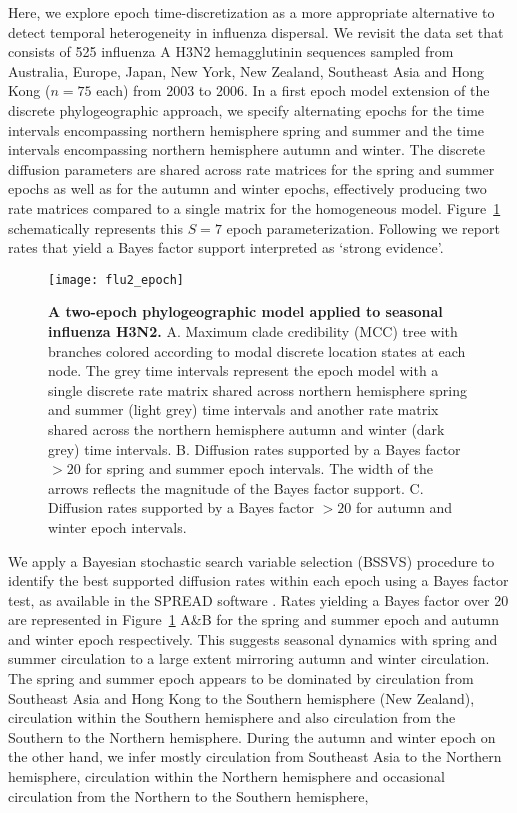 Here, we explore epoch time-discretization as a more appropriate alternative to detect temporal heterogeneity in influenza dispersal.
We revisit the \citet{Bahl2011} data set that consists of 525 influenza A H3N2 hemagglutinin sequences sampled from  Australia, Europe, Japan, New York, New Zealand, Southeast Asia and Hong Kong ($n=75$ each) from 2003 to 2006.
In a first epoch model extension of the discrete phylogeographic approach, we specify alternating epochs for the time intervals encompassing northern hemisphere spring and summer and the time intervals encompassing northern hemisphere autumn and winter.
The discrete diffusion parameters are shared across rate matrices for the spring and summer epochs as well as for the autumn and winter epochs, effectively producing two rate matrices compared to a single matrix for the homogeneous model. Figure~\ref{fig:2EpochFlu} schematically represents this $S=7$ epoch parameterization. 
Following \cite{KassRaftery95} we report rates that yield a Bayes factor support interpreted as `strong evidence'.

\begin{figure}[h!]
\centering
\texttt{[image: flu2\_epoch]} 
\caption{
{ \footnotesize 
{\bf A two-epoch phylogeographic model applied to seasonal influenza H3N2.} 
A. Maximum clade credibility (MCC) tree with branches colored according to modal discrete location states at each node. The grey time intervals represent the epoch model with a single discrete rate matrix shared across northern hemisphere spring and summer (light grey) time intervals and another rate matrix shared across the northern hemisphere autumn and winter (dark grey) time intervals. B. Diffusion rates supported by a Bayes factor $>20$ for spring and summer epoch intervals. The width of the arrows reflects the magnitude of the Bayes factor support. C. Diffusion rates supported by a Bayes factor $>20$ for autumn and winter epoch intervals.
}%
}
\label{fig:2EpochFlu}
\end{figure}

We apply a Bayesian stochastic search variable selection (BSSVS) procedure to identify the best supported diffusion rates within each epoch using a Bayes factor test, as available in the SPREAD software \citep{Bielejec2011}. Rates yielding a Bayes factor over 20 are represented in Figure~\ref{fig:2EpochFlu} A\&B for the spring and summer epoch and autumn and winter epoch respectively.
This suggests seasonal dynamics with spring and summer circulation to a large extent mirroring autumn and winter circulation.
The spring and summer epoch appears to be dominated by circulation from Southeast Asia and Hong Kong to the Southern hemisphere (New Zealand), circulation within the Southern hemisphere and also circulation from the Southern to the Northern hemisphere.
During the autumn and winter epoch on the other hand, we infer mostly circulation from Southeast Asia to the Northern hemisphere, circulation within the Northern hemisphere and occasional circulation from the Northern to the Southern hemisphere,

